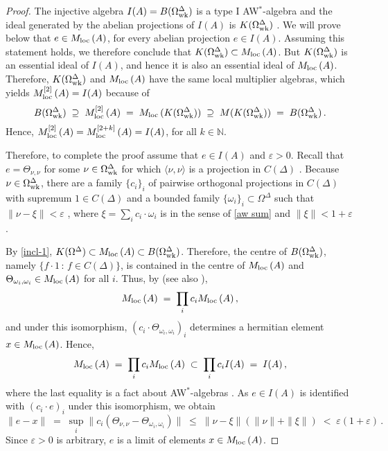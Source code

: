 \documentclass{amsart}
\theoremstyle{definition}
\theoremstyle{remark}
\begin{document}
\begin{proof} The injective algebra $I(A)=B(\Omega_{\rm wk}^\Delta)$ is a type I AW$^*$-algebra
and the ideal generated by the abelian projections of $I(A)$ is $K(\Omega_{\rm wk}^\Delta)$ \cite[Proposition 3.8]{argerami--farenick--massey2010}.
We will prove below that $e\in{M_{\rm loc}\,}(A)$, for every abelian projection $e\in I(A)$. Assuming this statement holds, we therefore conclude that
$K(\Omega_{\rm wk}^\Delta)\subset{M_{\rm loc}\,}(A)$. But $K(\Omega_{\rm wk}^\Delta)$ is an essential ideal of $I(A)$, and hence it  is also an essential ideal
of ${M_{\rm loc}\,} (A)$. Therefore, $K(\Omega_{\rm wk}^\Delta)$ and ${M_{\rm loc}\,}(A)$ have the same local multiplier algebras, which yields
${M_{\rm loc}^{[2]}\,}(A) =I(A)$ because of
\[
B(\Omega_{\rm wk}^\Delta)\;\supseteq\;{M_{\rm loc}^{[2]}\,}(A)\;=\;{M_{\rm loc}\,}(K(\Omega_{\rm wk}^\Delta))\;\supseteq\; M(K(\Omega_{\rm wk}^\Delta))
\;=\;B(\Omega_{\rm wk}^\Delta)\,.
\]
Hence, ${M_{\rm loc}^{[2]}\,}(A)={M_{\rm loc}^{[2+k]}\,}(A)=I(A)$, for all $k\in\mathbb N$.

Therefore, to complete the proof assume that $e\in I(A)$ and $\varepsilon>0$. Recall
that $e=\Theta_{\nu,\nu}$ for some $\nu\in \Omega_{\rm wk}^\Delta$ for which $\langle\nu,\nu\rangle$ is a projection
in $C(\Delta)$ \cite[Lemma 13]{kaplansky1953}. Because $\nu\in \Omega_{\rm wk}^\Delta$, there are a family $\{c_i\}_i$
of pairwise orthogonal projections in $C(\Delta)$ with supremum $1\in C(\Delta)$ and a bounded family $\{\omega_i\}_i\subset \Omega^\Delta$
such that $\|\nu-\xi\|<\varepsilon$ \cite[Proposition 4.4]{argerami--farenick--massey2010}, where
$\xi=\sum_ic_i\cdot\omega_i$ is in the sense of \eqref{aw sum} and $\|\xi\|<1+\varepsilon$.

By \eqref{incl-1}, $K(\Omega^\Delta)\subset{M_{\rm loc}\,}(A)\subset B(\Omega_{\rm wk}^\Delta)$. Therefore, the centre of
$B(\Omega_{\rm wk}^\Delta)$, namely $\{f\cdot 1\,:\,f\in C(\Delta)\}$,  is contained in the centre of ${M_{\rm loc}\,}(A)$ and
$\Theta_{\omega_i,\omega_i}\in{M_{\rm loc}\,}(A)$ for all $i$. Thus, by
\cite[Lemma 3.3.6]{Ara--Mathieu-book} (see also \cite[Lemma 2.3 ]{somerset1996}),
\[
{M_{\rm loc}\,}(A)\;=\;\displaystyle\prod_{i} c_i{M_{\rm loc}\,}(A)\,,
\]
and under this isomorphism, $\left(c_i\cdot \Theta_{\omega_i,\omega_i}\right)_i$ determines a hermitian element $x\in{M_{\rm loc}\,}(A)$.
Hence,
\[
{M_{\rm loc}\,}(A) \;=\;\displaystyle\prod_{i} c_i{M_{\rm loc}\,}(A)\;\subset\;\displaystyle\prod_{i} c_i I(A)\;=\; I(A)\,,
\]
where the last equality is a fact about AW$^*$-algebras \cite[Lemma 2.7]{kaplansky1951}. As $e\in I(A)$ is identified with $(c_i\cdot e)_i$
under this isomorphism, we obtain
\[
\|e-x\|\;=\;\sup_i\|c_i\left(\Theta_{\nu,\nu}-\Theta_{\omega_i,\omega_i}\right)\|
\;\leq\;\|\nu-\xi\|\left(\|\nu\|+\|\xi\|\right)\;<\;\varepsilon(1+\varepsilon)\,.
\]
Since $\varepsilon>0$ is arbitrary, $e$ is a limit of elements $x\in{M_{\rm loc}\,}(A)$.
 \end{proof}
\end{document}
